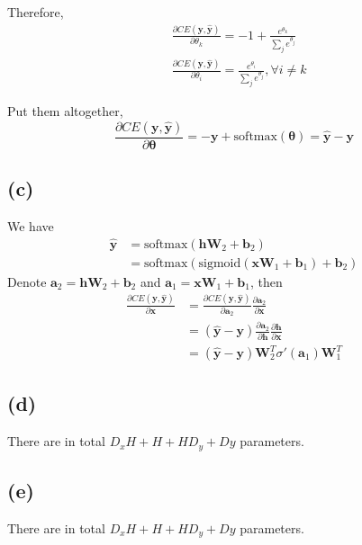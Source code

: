 \documentclass[12pt]{article}
\begin{document}
Therefore, 
\begin{align*}
&\frac{\partial CE(\bm y, \bm {\hat y})} {\partial \theta_k} = -1 + \frac{e^{\theta_k}}{\sum_j e^{\theta_j}}  \\
&\frac{\partial CE(\bm y, \bm {\hat y})} {\partial \theta_i} =  \frac{e^{\theta_i}}{\sum_j e^{\theta_j}}, \forall i \neq k
\end{align*}

Put them altogether,
$$
\frac{\partial CE(\bm y, \bm {\hat y})} {\partial \bm \theta} = -\bm y + \text{softmax}(\bm {\theta}) = \bm {\hat y} - \bm y
$$

\subsection*{(c)}
We have 
\begin{align*}
\bm {\hat y} &= \text{softmax}(\bm h \bm W_2 + \bm b_2) \\
	           &= \text{softmax} \left ( \text{sigmoid} (\bm x \bm W_1 + \bm b_1)  + \bm b_2\right)
\end{align*}
Denote $\bm a_2 = \bm h \bm W_2 + \bm b_2$ and $\bm a_1 = \bm x \bm W_1 + \bm b_1$, then 
\begin{align*}
\frac{\partial CE(\bm y, \bm {\hat y})} {\partial \bm x} &=  \frac{\partial CE(\bm y, \bm {\hat y})}{\partial \bm a_2} \frac{\partial \bm a_2}{\partial \bm x} \\
&=  (\bm {\hat y} - \bm y) \frac{\partial \bm a_2}{\partial \bm h} \frac{\partial \bm h} {\partial \bm x} \\
&= (\bm {\hat y} - \bm y) \bm W_2^T \sigma'(\bm a_1) \bm W_1^T
\end{align*}

\subsection*{(d)}

There are in total $D_x H + H +H D_y+Dy$ parameters.

\subsection*{(e)}

There are in total $D_x H + H +H D_y+Dy$ parameters.
	
\end{document}

